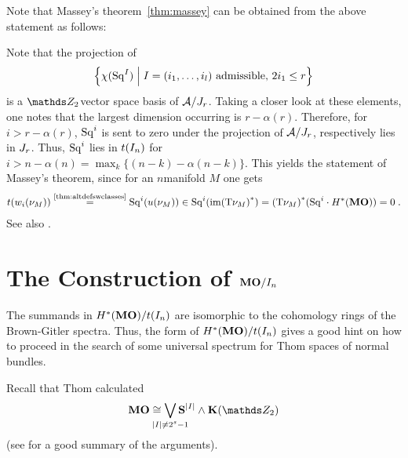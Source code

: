 Note that Massey's theorem~\ref{thm:massey} can be obtained
from the above statement as follows:
\begin{Rem*}
  Note that the projection of
  \begin{gather*}
    \left\{
      \chi(\mathrm{Sq}^{I}) \;\middle|\;
      I=(i_1,\dotsc,i_l) \text{ admissible, } 2i_1\leq r
    \right\}
  \end{gather*}
  is a $\Zmod2$\nbd{}vector space basis of $\mathcal{A}/J_{r}$.
  Taking a closer look at these elements, one notes that the
  largest dimension occurring is $r-\alpha(r)$.
  Therefore, for $i>r-\alpha(r)$, $\mathrm{Sq}^{i}$ is sent to zero under the
  projection of $\mathcal{A}/J_{r}$, respectively lies in $J_{r}$.
  Thus, $\mathrm{Sq}^{i}$ lies in $t(I_{n})$ for
  $i>n-\alpha(n)=\max_k\{(n-k)-\alpha(n-k)\}$.
  This yields the statement of Massey's theorem, since for an
  $n$\nbd{}manifold $M$ one gets
  \begin{gather*}
    t({w_{i}}(\nu_{M}))
    \overset{\text{\ref{thm:altdefswclasses}}}= \mathrm{Sq}^{i}({u}(\nu_{M}))
    \in \mathrm{Sq}^{i}(\mathrm{im}{(\mathrm{T}\nu_{M})}^*)
    = {(\mathrm{T}\nu_{M})}^* (\mathrm{Sq}^{i}\cdot H^*(\bm{\mathrm{MO}}))
    = 0
    \;.
  \end{gather*}
  See also \cite[p.~93]{immersionconj}.
\end{Rem*}

\section*{The Construction of $\bm{\mathrm{MO}}/I_{n}$}
The summands in $H^*(\bm{\mathrm{MO}})/t(I_{n})$ are isomorphic to the
cohomology rings of the Brown-Gitler spectra.
Thus, the form of $H^*(\bm{\mathrm{MO}})/t(I_{n})$ gives a good hint on how
to proceed in the search of some universal spectrum for Thom spaces of
normal bundles.

\begin{Rem*}
  Recall that Thom calculated
  \begin{gather*}
    \MOspec
    \cong \bigvee_{\mathclap{\Deg{I}\neq 2^s-1}}
    \Spherespec{\Deg{I}} \smashprod \EMspec
  \end{gather*}
  (see \cite[p.~81f]{immersionconj} for a good summary of the arguments).
\end{Rem*}

